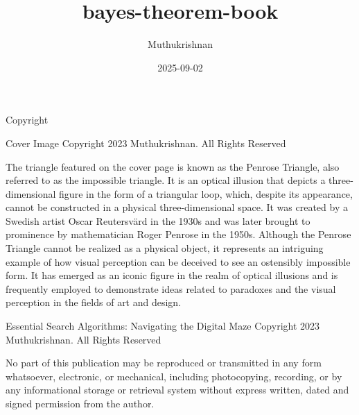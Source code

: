 \documentclass[
  letterpaper,
  paper=6in:9in,pagesize=pdftex,footinclude=on,11pt]{scrreprt}
\title{bayes-theorem-book}
\author{Muthukrishnan}
\date{2025-09-02}
\begin{document}
\maketitle

\newpage


\begin{flushleft}
\Large Copyright
\end{flushleft}

\vspace*{\baselineskip}

\begin{flushleft}
\large Cover Image
\large Copyright 2023 Muthukrishnan. All Rights Reserved 
\end{flushleft}



\vspace{5mm} %

The triangle featured on the cover page is known as the Penrose Triangle, also referred to as the impossible triangle. It is an optical illusion that depicts a three-dimensional figure in the form of a triangular loop, which, despite its appearance, cannot be constructed in a physical three-dimensional space. It was created by a Swedish artist Oscar Reutersvärd in the 1930s and was later brought to prominence by mathematician Roger Penrose in the 1950s. Although the Penrose Triangle cannot be realized as a physical object, it represents an intriguing example of how visual perception can be deceived to see an ostensibly impossible form. It has emerged as an iconic figure in the realm of optical illusions and is frequently employed to demonstrate ideas related to paradoxes and the visual perception in the fields of art and design.


\vspace{5mm} %

\begin{flushleft}
\large Essential Search Algorithms: Navigating the Digital Maze
\large Copyright 2023 Muthukrishnan. All Rights Reserved
\end{flushleft}

\vspace{5mm} %

No part of this publication may be reproduced or transmitted in any form whatsoever, electronic, or mechanical, including photocopying, recording, or by any informational storage or retrieval system without express written, dated and signed permission from the author.
\end{document}

